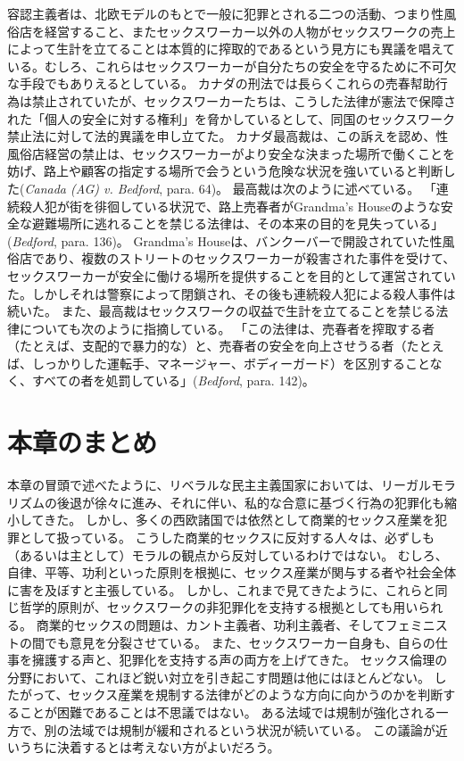\documentclass[paper=a4,book,openany]{jlreq} \usepackage{mystyle}
\begin{document}
容認主義者は、北欧モデルのもとで一般に犯罪とされる二つの活動、つまり性風俗店を経営すること、またセックスワーカー以外の人物がセックスワークの売上によって生計を立てることは本質的に搾取的であるという見方にも異議を唱えている。むしろ、これらはセックスワーカーが自分たちの安全を守るために不可欠な手段でもありえるとしている。
カナダの刑法では長らくこれらの売春幇助行為は禁止されていたが、セックスワーカーたちは、こうした法律が憲法で保障された「個人の安全に対する権利」を脅かしているとして、同国のセックスワーク禁止法に対して法的異議を申し立てた。
カナダ最高裁は、この訴えを認め、性風俗店経営の禁止は、セックスワーカーがより安全な決まった場所で働くことを妨げ、路上や顧客の指定する場所で会うという危険な状況を強いていると判断した(\emph{Canada (AG) v. Bedford}, para. 64)。
最高裁は次のように述べている。
「連続殺人犯が街を徘徊している状況で、路上売春者がGrandma's Houseのような安全な避難場所に逃れることを禁じる法律は、その本来の目的を見失っている」(\emph{Bedford}, para. 136)。
Grandma's Houseは、バンクーバーで開設されていた性風俗店であり、複数のストリートのセックスワーカーが殺害された事件を受けて、セックスワーカーが安全に働ける場所を提供することを目的として運営されていた。しかしそれは警察によって閉鎖され、その後も連続殺人犯による殺人事件は続いた。
また、最高裁はセックスワークの収益で生計を立てることを禁じる法律についても次のように指摘している。
「この法律は、売春者を搾取する者（たとえば、支配的で暴力的な）と、売春者の安全を向上させうる者（たとえば、しっかりした運転手、マネージャー、ボディーガード）を区別することなく、すべての者を処罰している」(\emph{Bedford}, para. 142)。
\section{本章のまとめ}

本章の冒頭で述べたように、リベラルな民主主義国家においては、リーガルモラリズムの後退が徐々に進み、それに伴い、私的な合意に基づく行為の犯罪化も縮小してきた。
しかし、多くの西欧諸国では依然として商業的セックス産業を犯罪として扱っている。
こうした商業的セックスに反対する人々は、必ずしも（あるいは主として）モラルの観点から反対しているわけではない。
むしろ、自律、平等、功利といった原則を根拠に、セックス産業が関与する者や社会全体に害を及ぼすと主張している。
しかし、これまで見てきたように、これらと同じ哲学的原則が、セックスワークの非犯罪化を支持する根拠としても用いられる。
商業的セックスの問題は、カント主義者、功利主義者、そしてフェミニストの間でも意見を分裂させている。
また、セックスワーカー自身も、自らの仕事を擁護する声と、犯罪化を支持する声の両方を上げてきた。
セックス倫理の分野において、これほど鋭い対立を引き起こす問題は他にはほとんどない。
したがって、セックス産業を規制する法律がどのような方向に向かうのかを判断することが困難であることは不思議ではない。
ある法域では規制が強化される一方で、別の法域では規制が緩和されるという状況が続いている。
この議論が近いうちに決着するとは考えない方がよいだろう。
\end{document}
